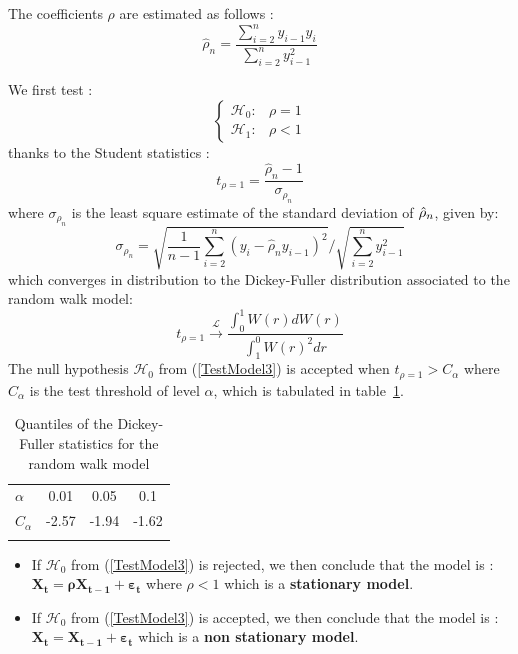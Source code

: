 The coefficients $\rho$ are estimated as follows :
\begin{equation}\label{Model3Estim}
  \hat{\rho}_n=\frac{\sum_{i=2}^ny_{i-1}y_i}{\sum_{i=2}^ny_{i-1}^2}
\end{equation}


We first test :
\begin{equation}\label{TestModel3}
  \left\{
  \begin{array}{lr}
    \mathcal{H}_0 :  & \rho = 1 \\
    \mathcal{H}_1 : & \rho < 1
  \end{array}
  \right.
\end{equation}
thanks to the Student statistics :
\begin{equation}\label{stdtStat}
  t_{\rho=1} = \frac{\hat{\rho}_n-1}{\sigma_{\rho_n}}
\end{equation}
where $\sigma_{\rho_n}$ is the least square estimate of the standard deviation of $\Hat{\rho}_n$, given by:
\begin{equation}
  \sigma_{\rho_n}=\sqrt{\frac{1}{n-1}\sum_{i=2}^n\left(y_{i}-\hat{\rho}_ny_{i-1}\right)^2}/\sqrt{\sum_{i=2}^ny_{i-1}^2}
\end{equation}
which converges in distribution to the Dickey-Fuller distribution associated to the random walk model:
\begin{equation}
  t_{\rho = 1} \stackrel{\mathcal{L}}{\longrightarrow} \frac{\int_{0}^{1}W(r) dW(r)}{\int_{1}^{0} W(r)^2 dr}
\end{equation}
The null hypothesis $\mathcal{H}_0$  from (\ref{TestModel3}) is accepted when $t_{\rho=1} > C_{\alpha}$ where $C_{\alpha}$ is the test threshold of  level  $\alpha$, which is tabulated in table~\ref{DickeyFullerPval3}.\\

\begin{table}
  \centering
  \begin{tabular}{lccc}
    \hline\noalign{\smallskip}
    $\alpha$ & 0.01 & 0.05 & 0.1 \\
    \noalign{\smallskip}\hline\noalign{\smallskip}
    $C_{\alpha}$ & -2.57 & -1.94 & -1.62 \\
    \noalign{\smallskip}\hline
  \end{tabular}
  \caption{Quantiles of the Dickey-Fuller statistics for the random walk model}\label{DickeyFullerPval3}
\end{table}


\begin{itemize}
\item If $\mathcal{H}_0$  from (\ref{TestModel3}) is rejected, we then conclude that the model is : $\boldsymbol{X_t = \rho X_{t-1} + \varepsilon_{t}}$ where $\rho < 1$ which is a {\bf  stationary model}.
\item  If $\mathcal{H}_0$  from (\ref{TestModel3}) is accepted, we then conclude that the model is : $\boldsymbol{X_t = X_{t-1} + \varepsilon_{t}}$ which is a {\bf non stationary model}.
\end{itemize}







